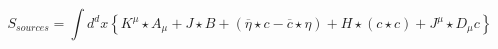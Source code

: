\begin{equation}
S_{sources}=\int d^{d}x\left\{K^{\mu}\star A_{\mu}+J\star
B+(\overline{\eta}\star c-\overline{c}\star\eta)+H\star(c\star
c)+J^{\mu}\star D_{\mu}c\right\}
\end{equation}

